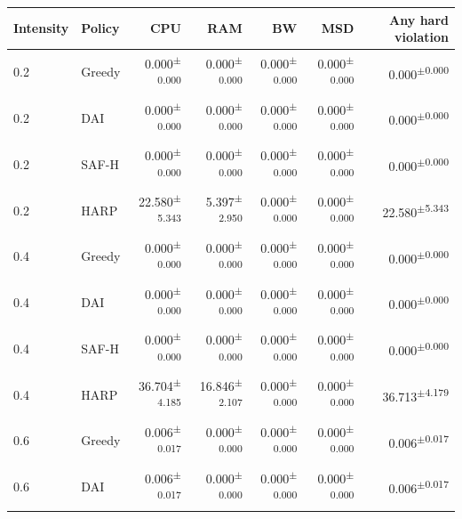 \documentclass[final,5p]{elsarticle}
\begin{document}
\begin{table}[p]
\centering
\color{revisiongreen}\small
\begin{tabular}{llrrrrr}
\toprule
Intensity & Policy & CPU & RAM & BW & MSD & Any hard violation \\
\midrule
0.2 & Greedy & 0.000\textsuperscript{$\pm$0.000} & 0.000\textsuperscript{$\pm$0.000} & 0.000\textsuperscript{$\pm$0.000} & 0.000\textsuperscript{$\pm$0.000} & 0.000\textsuperscript{$\pm$0.000} \\
0.2 & DAI & 0.000\textsuperscript{$\pm$0.000} & 0.000\textsuperscript{$\pm$0.000} & 0.000\textsuperscript{$\pm$0.000} & 0.000\textsuperscript{$\pm$0.000} & 0.000\textsuperscript{$\pm$0.000} \\
0.2 & SAF-H & 0.000\textsuperscript{$\pm$0.000} & 0.000\textsuperscript{$\pm$0.000} & 0.000\textsuperscript{$\pm$0.000} & 0.000\textsuperscript{$\pm$0.000} & 0.000\textsuperscript{$\pm$0.000} \\
0.2 & HARP & 22.580\textsuperscript{$\pm$5.343} & 5.397\textsuperscript{$\pm$2.950} & 0.000\textsuperscript{$\pm$0.000} & 0.000\textsuperscript{$\pm$0.000} & 22.580\textsuperscript{$\pm$5.343} \\
0.4 & Greedy & 0.000\textsuperscript{$\pm$0.000} & 0.000\textsuperscript{$\pm$0.000} & 0.000\textsuperscript{$\pm$0.000} & 0.000\textsuperscript{$\pm$0.000} & 0.000\textsuperscript{$\pm$0.000} \\
0.4 & DAI & 0.000\textsuperscript{$\pm$0.000} & 0.000\textsuperscript{$\pm$0.000} & 0.000\textsuperscript{$\pm$0.000} & 0.000\textsuperscript{$\pm$0.000} & 0.000\textsuperscript{$\pm$0.000} \\
0.4 & SAF-H & 0.000\textsuperscript{$\pm$0.000} & 0.000\textsuperscript{$\pm$0.000} & 0.000\textsuperscript{$\pm$0.000} & 0.000\textsuperscript{$\pm$0.000} & 0.000\textsuperscript{$\pm$0.000} \\
0.4 & HARP & 36.704\textsuperscript{$\pm$4.185} & 16.846\textsuperscript{$\pm$2.107} & 0.000\textsuperscript{$\pm$0.000} & 0.000\textsuperscript{$\pm$0.000} & 36.713\textsuperscript{$\pm$4.179} \\
0.6 & Greedy & 0.006\textsuperscript{$\pm$0.017} & 0.000\textsuperscript{$\pm$0.000} & 0.000\textsuperscript{$\pm$0.000} & 0.000\textsuperscript{$\pm$0.000} & 0.006\textsuperscript{$\pm$0.017} \\
0.6 & DAI & 0.006\textsuperscript{$\pm$0.017} & 0.000\textsuperscript{$\pm$0.000} & 0.000\textsuperscript{$\pm$0.000} & 0.000\textsuperscript{$\pm$0.000} & 0.006\textsuperscript{$\pm$0.017} \\

\end{tabular}
\end{table}
\end{document}
